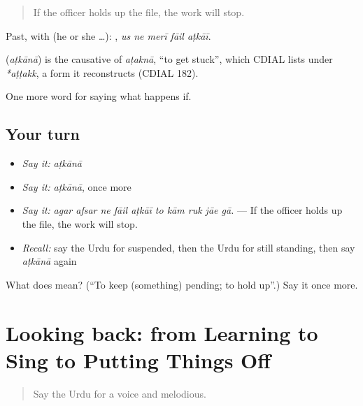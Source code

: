 \begin{quote}
If the officer holds up the file, the work will stop.
\end{quote}

Past, with  (he or she …):     , \emph{us ne merī fāil aṭkāī}.

\begin{cousinweb}
\textbf{} (\emph{aṭkānā}) is the causative of \emph{aṭaknā}, \textquotedblleft{}to get stuck\textquotedblright{}, which CDIAL lists under \emph{*aṭṭakk}, a form it reconstructs (CDIAL 182).
\end{cousinweb}

\begin{grammarlens}[title={What you've built}]
One more word for saying what happens if.
\end{grammarlens}

\subsection*{Your turn}
\begin{itemize}
\raggedright
  \item \emph{Say it:} \emph{aṭkānā}
  \item \emph{Say it:} \emph{aṭkānā}, once more
  \item \emph{Say it:} \emph{agar afsar ne fāil aṭkāī to kām ruk jāe gā.} — If the officer holds up the file, the work will stop.
  \item \emph{Recall:} say the Urdu for suspended, then the Urdu for still standing, then say \emph{aṭkānā} again
\end{itemize}

\begin{tcolorbox}[breakable,colback=teal!4,colframe=teal!35!black,title={Before you move on}]
What does  mean? (\textquotedblleft{}To keep (something) pending; to hold up\textquotedblright{}.) Say it once more.
\end{tcolorbox}
\section[(dialogue)]{Looking back: from Learning to Sing to Putting Things Off}

\label{lesson:UR-R525-review-518-525}



\begin{quote}
Say the Urdu for a voice and melodious.
\end{quote}

